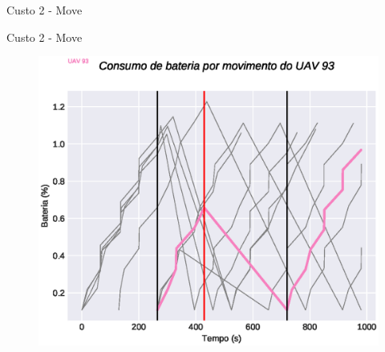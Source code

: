 \begin{frame}{Custo 2 - Move}
\begin{figure}[!htb]
                 \end{figure}
            \end{frame}\begin{frame}{Custo 2 - Move}
                \begin{figure}[!htb]
                     \includegraphics[width=\textwidth]{custo_2/uav_move_acum_uav_7.eps}
                 \end{figure}
            \end{frame}